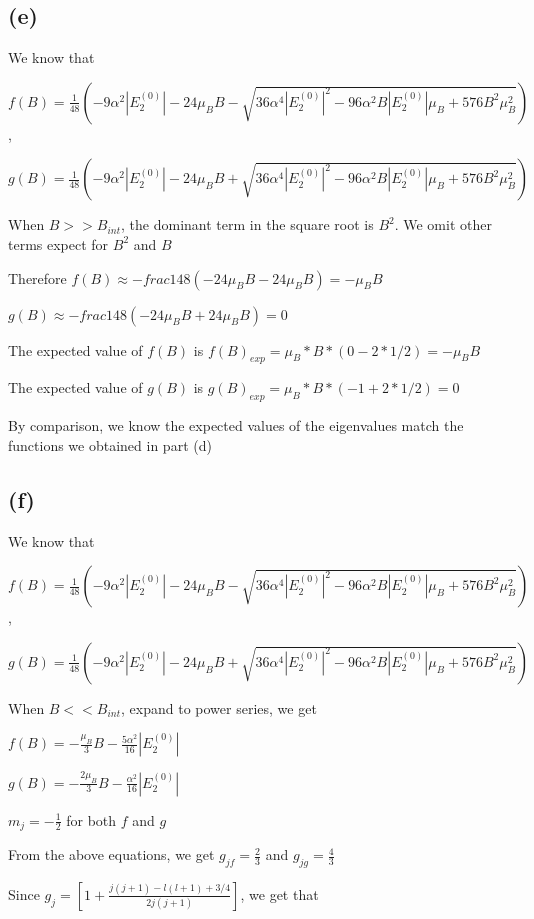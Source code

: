 \documentclass[12pt]{article}
\begin{document}
\begin{spacing}{2.0}
\subsection*{(e)}

We know that

$f(B)=\frac{1}{48} \left(-9 \alpha^2 |E_2^{(0)}|-24\mu_B B-\sqrt{36 \alpha^4|E_2^{(0)}|^2-96 \alpha^2 B|E_2^{(0)}|\mu_B+ 576B^2\mu_B^2 }\right)$ ,

$g(B)=\frac{1}{48} \left(-9 \alpha^2 |E_2^{(0)}|-24\mu_B B+\sqrt{36 \alpha^4|E_2^{(0)}|^2-96 \alpha^2 B|E_2^{(0)}|\mu_B+ 576B^2\mu_B^2 }\right)$

When $B>>B_{int}$, the dominant term in the square root is $B^2$. We omit other terms expect for $B^2$ and $B$

Therefore $f(B)\approx -frac{1}{48}(-24\mu_B B -24\mu_B B)= -\mu_B B$

$g(B) \approx -frac{1}{48} (-24\mu_B B +24\mu_B B) = 0$

The expected value of $f(B)$ is $f(B)_{exp}= \mu_B *B * (0-2*1/2)=-\mu_B B$

The expected value of $g(B)$ is $g(B)_{exp}= \mu_B *B * (-1+2*1/2)=0$

By comparison, we know the expected values of the eigenvalues match the functions we obtained in part (d)

\subsection*{(f)}

We know that

$f(B)=\frac{1}{48} \left(-9 \alpha^2 |E_2^{(0)}|-24\mu_B B-\sqrt{36 \alpha^4|E_2^{(0)}|^2-96 \alpha^2 B|E_2^{(0)}|\mu_B+ 576B^2\mu_B^2 }\right)$ ,

$g(B)=\frac{1}{48} \left(-9 \alpha^2 |E_2^{(0)}|-24\mu_B B+\sqrt{36 \alpha^4|E_2^{(0)}|^2-96 \alpha^2 B|E_2^{(0)}|\mu_B+ 576B^2\mu_B^2 }\right)$

When $B<<B_{int}$, expand to power series, we get

$f(B)= -\frac{\mu_B }{3}B -\frac{5\alpha^2}{16} |E_2^{(0)}|$

$g(B)= -\frac{2\mu_B }{3}B -\frac{\alpha^2}{16} |E_2^{(0)}|$

$m_j=-\frac{1}{2}$ for both $f$ and $g$

From the above equations, we get $g_{jf}= \frac{2}{3}$ and $g_{jg}= \frac{4}{3}$

Since $g_j = \left[ 1+ \frac{j(j+1)-l(l+1)+3/4}{2j(j+1)} \right]$, we get that 


\end{spacing}
\end{document}
